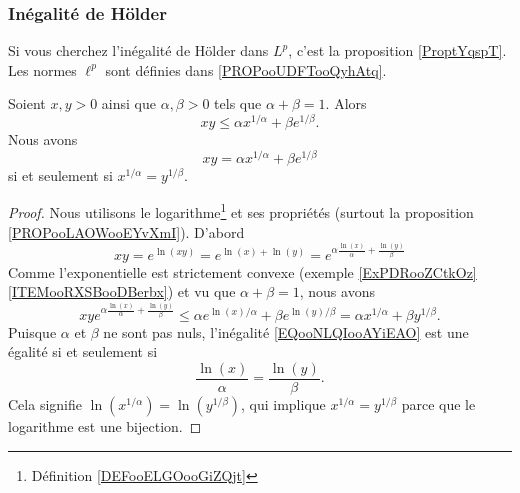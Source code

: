 \subsubsection{Inégalité de Hölder}

Si vous cherchez l'inégalité de Hölder dans \( L^p\), c'est la proposition \ref{ProptYqspT}. Les normes \(  \ell^p\) sont définies dans \ref{PROPooUDFTooQyhAtq}.

\begin{lemma}     \label{LEMooLGGDooGLGFHj}
    Soient \( x,y>0\) ainsi que \( \alpha,\beta>0\) tels que \( \alpha+\beta=1\). Alors
    \begin{equation}
        xy\leq \alpha x^{1/\alpha}+\beta e^{1/\beta}.
    \end{equation}
    Nous avons
    \begin{equation}
        xy= \alpha x^{1/\alpha}+\beta e^{1/\beta}
    \end{equation}
    si et seulement si \( x^{1/\alpha}=y^{1/\beta}\).
\end{lemma}

\begin{proof}
    Nous utilisons le logarithme\footnote{Définition \ref{DEFooELGOooGiZQjt}} et ses propriétés (surtout la proposition \ref{PROPooLAOWooEYvXmI}). D'abord
    \begin{equation}
        xy= e^{\ln(xy)}= e^{\ln(x)+\ln(y)}= e^{\alpha\frac{ \ln(x) }{ \alpha }+\frac{ \ln(y) }{ \beta }}
    \end{equation}
    Comme l'exponentielle est strictement convexe (exemple \ref{ExPDRooZCtkOz}\ref{ITEMooRXSBooDBerbx}) et vu que \( \alpha+\beta=1\), nous avons
    \begin{equation}        \label{EQooNLQIooAYiEAO}
        xy e^{\alpha\frac{ \ln(x) }{ \alpha }+\frac{ \ln(y) }{ \beta }}\leq \alpha e^{\ln(x)/\alpha}+\beta e^{\ln(y)/\beta}=\alpha x^{1/\alpha}+\beta y^{1/\beta}.
    \end{equation}
    Puisque \( \alpha\) et \( \beta\) ne sont pas nuls, l'inégalité \eqref{EQooNLQIooAYiEAO} est une égalité si et seulement si
    \begin{equation}
        \frac{ \ln(x) }{ \alpha }=\frac{ \ln(y) }{ \beta }.
    \end{equation}
    Cela signifie \( \ln(x^{1/\alpha})=\ln(y^{1/\beta})\), qui implique \( x^{1/\alpha}=y^{1/\beta}\) parce que le logarithme est une bijection.
\end{proof}

